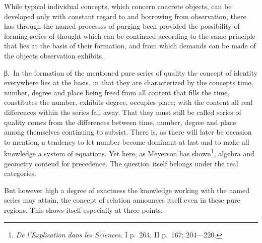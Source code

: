 \documentclass[12pt]{article}
\newcommand{\opage}[1]{\marginnote{\footnotesize\textit{[#1]}}}
\begin{document}
While typical individual concepts, which concern concrete objects, can be
developed only with constant regard to and borrowing from observation, there
has through the named processes of purging been provided the possibility of
forming series of thought which can be continued according to the same
principle that \opage{40}lies at the basis of their formation, and from which demands
can be made of the objects observation exhibits.

%
\label{sec:3b-beta}%
β.~In the formation of the mentioned pure series of quality the concept of
identity everywhere lies at the basis, in that they are characterized by the
concepts time, number, degree and place being freed from all content that
fills the time, constitutes the number, exhibits degree, occupies place;
with the content all real differences within the series fall away. That they
must still be called series of quality comes from the differences between
time, number, degree and place among themselves continuing to subsist. There
is, as there will later be occasion to mention, a tendency to let number
become dominant at last and to make all knowledge a system of equations.
Yet here, as Meyerson has shown\footnote{\textit{De l'Explication dans les
Sciences.} I p.~264; II p.~167; 204---220.}, algebra and geometry contend
for precedence. The question itself belongs under the real categories.

But however high a degree of exactness the knowledge working with the named
series may attain, the concept of relation announces itself even in these
pure regions. This shows itself especially at three points.
\end{document}
